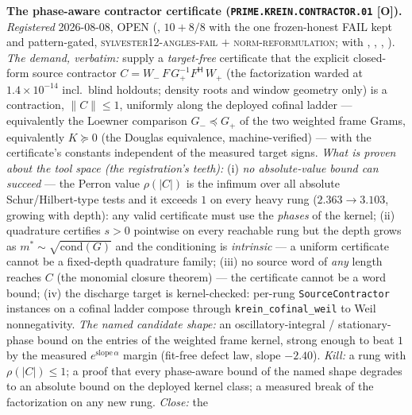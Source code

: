 \par\smallskip\noindent\textbf{The phase-aware contractor
certificate (\texttt{PRIME.KREIN.\allowbreak CONTRACTOR.01}
[O]).}
{\sloppy
\emph{Registered} 2026-08-08, OPEN
(, $10 + 8/8$ with
the one frozen-honest FAIL kept and pattern-gated,
\textsc{sylvester12-angles-fail} $+$
\textsc{norm-reformulation}; with
,
,
,
).  \emph{The demand,
verbatim:} supply a \emph{target-free} certificate that the
explicit closed-form source contractor
$C = W_-\,F\,G_+^{-1}F^{\mathsf H}\,W_+$ (the factorization
warded at $1.4\times10^{-14}$ incl.\ blind holdouts; density
roots and window geometry only) is a contraction, $\|C\| \le
1$, uniformly along the deployed cofinal ladder ---
equivalently the Loewner comparison $G_- \preceq G_+$ of the
two weighted frame Grams, equivalently $K \succeq 0$ (the
Douglas equivalence, machine-verified) --- with the
certificate's constants independent of the measured target
signs.  \emph{What is proven about the tool space (the
registration's teeth):} (i) \emph{no absolute-value bound can
succeed} --- the Perron value $\rho(|C|)$ is the infimum over
all absolute Schur/Hilbert-type tests and it exceeds $1$ on
every heavy rung ($2.363 \to 3.103$, growing with depth): any
valid certificate must use the \emph{phases} of the kernel;
(ii) quadrature certifies $s > 0$ pointwise on every reachable
rung but the depth grows as $m^* \sim \sqrt{\mathrm{cond}(G)}$
and the conditioning is \emph{intrinsic} --- a uniform
certificate cannot be a fixed-depth quadrature family; (iii) no
source word of \emph{any} length reaches $C$ (the monomial
closure theorem) --- the certificate cannot be a word bound;
(iv) the discharge target is kernel-checked: per-rung
\texttt{SourceContractor} instances on a cofinal ladder compose
through \texttt{krein\_cofinal\_weil} to Weil nonnegativity.
\emph{The named candidate shape:} an oscillatory-integral /
stationary-phase bound on the entries of the weighted frame
kernel, strong enough to beat $1$ by the measured
$e^{\mathrm{slope}\,\alpha}$ margin (fit-free defect law, slope
$-2.40$).  \emph{Kill:} a rung with $\rho(|C|) \le 1$; a proof
that every phase-aware bound of the named shape degrades to an
absolute bound on the deployed kernel class; a measured break
of the factorization on any new rung.  \emph{Close:} the
}
